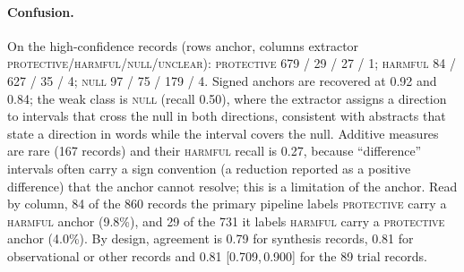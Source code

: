 \documentclass[11pt]{article}
\newcommand{\ci}[2]{[#1,\,#2]}
\begin{document}
\paragraph{Confusion.} On the high-confidence records (rows anchor, columns extractor
\textsc{protective}/\textsc{harmful}/\textsc{null}/\textsc{unclear}): \textsc{protective} 679 / 29 /
27 / 1; \textsc{harmful} 84 / 627 / 35 / 4; \textsc{null} 97 / 75 / 179 / 4. Signed anchors are
recovered at 0.92 and 0.84; the weak class is \textsc{null} (recall 0.50), where the extractor
assigns a direction to intervals that cross the null in both directions, consistent with abstracts
that state a direction in words while the interval covers the null. Additive measures are rare
(167 records) and their \textsc{harmful} recall is 0.27, because ``difference'' intervals often carry
a sign convention (a reduction reported as a positive difference) that the anchor cannot resolve;
this is a limitation of the anchor. Read by column, 84 of the 860 records the primary pipeline
labels \textsc{protective} carry a \textsc{harmful} anchor (9.8\%), and 29 of the 731 it labels
\textsc{harmful} carry a \textsc{protective} anchor (4.0\%). By design, agreement is 0.79 for synthesis records, 0.81 for
observational or other records and 0.81 \ci{0.709}{0.900} for the 89 trial records.
\end{document}
